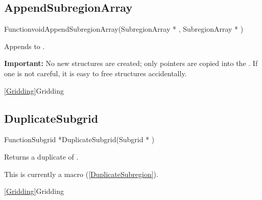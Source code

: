 \newpage
\subsection{AppendSubregionArray}
\label{AppendSubregionArray}


\begin{deftypefn}{Function}{void}{AppendSubregionArray}({SubregionArray *} , {SubregionArray *} )

\DESCRIPTION
Appends  to .

\NOTES
{\bf Important:}
No new  structures are created; only pointers
are copied into the .
If one is not careful, it is easy to free  structures
accidentally.

\SEEALSO
\vref{Gridding}{Gridding}

\end{deftypefn}


\newpage
\subsection{DuplicateSubgrid}
\label{DuplicateSubgrid}


\begin{deftypefn}{Function}{Subgrid *}{DuplicateSubgrid}({Subgrid *} )

\DESCRIPTION
Returns a duplicate of .

\NOTES
This is currently a macro (\ref{DuplicateSubregion}).

\SEEALSO
\vref{Gridding}{Gridding}

\end{deftypefn}


